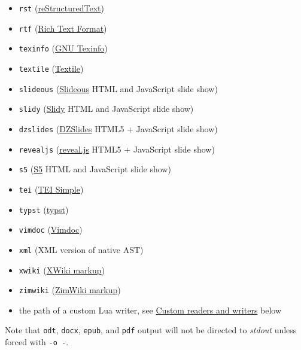 \documentclass[
]{article}
\begin{document}
\begin{description}
\begin{itemize}
  \texttt{pptx}
  (\href{https://en.wikipedia.org/wiki/Microsoft_PowerPoint}{PowerPoint}
  slide show)
\item
  \texttt{rst}
  (\href{https://docutils.sourceforge.io/docs/ref/rst/introduction.html}{reStructuredText})
\item
  \texttt{rtf}
  (\href{https://en.wikipedia.org/wiki/Rich_Text_Format}{Rich Text
  Format})
\item
  \texttt{texinfo} (\href{https://www.gnu.org/software/texinfo/}{GNU
  Texinfo})
\item
  \texttt{textile} (\href{https://textile-lang.com}{Textile})
\item
  \texttt{slideous}
  (\href{https://goessner.net/articles/slideous/}{Slideous} HTML and
  JavaScript slide show)
\item
  \texttt{slidy} (\href{https://www.w3.org/Talks/Tools/Slidy2/}{Slidy}
  HTML and JavaScript slide show)
\item
  \texttt{dzslides} (\href{https://paulrouget.com/dzslides/}{DZSlides}
  HTML5 + JavaScript slide show)
\item
  \texttt{revealjs} (\href{https://revealjs.com/}{reveal.js} HTML5 +
  JavaScript slide show)
\item
  \texttt{s5} (\href{https://meyerweb.com/eric/tools/s5/}{S5} HTML and
  JavaScript slide show)
\item
  \texttt{tei} (\href{https://github.com/TEIC/TEI-Simple}{TEI Simple})
\item
  \texttt{typst} (\href{https://typst.app}{typst})
\item
  \texttt{vimdoc}
  (\href{https://vimhelp.org/helphelp.txt.html\#help-writing}{Vimdoc})
\item
  \texttt{xml} (XML version of native AST)
\item
  \texttt{xwiki}
  (\href{https://www.xwiki.org/xwiki/bin/view/Documentation/UserGuide/Features/XWikiSyntax/}{XWiki
  markup})
\item
  \texttt{zimwiki}
  (\href{https://zim-wiki.org/manual/Help/Wiki_Syntax.html}{ZimWiki
  markup})
\item
  the path of a custom Lua writer, see
  \protect\hyperlink{custom-readers-and-writers}{Custom readers and
  writers} below
\end{itemize}

Note that \texttt{odt}, \texttt{docx}, \texttt{epub}, and \texttt{pdf}
output will not be directed to \emph{stdout} unless forced with
\texttt{-o\ -}.


\end{description}
\end{document}
